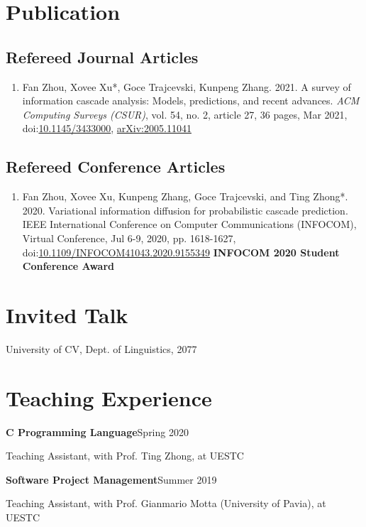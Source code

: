 \documentclass{article}
\newcommand{\cvsection}[1]{\section*{\rmfamily#1}}
\newcommand{\cvsubsection}[1]{\subsection*{\rmfamily\hspace{1.6em}#1}}
\begin{document}
\section*{Publication}

\cvsubsection{Refereed Journal Articles}

\begin{enumerate}[resume]
    \item Fan Zhou, Xovee Xu*, Goce Trajcevski, Kunpeng Zhang. 2021. A survey of information cascade analysis: Models, predictions, and recent advances. \textit{ACM Computing Surveys (CSUR)}, vol. 54, no. 2, article 27, 36 pages, Mar 2021, doi:\href{https://xovee.cn/html/paper-redirects/csur2021.html}{10.1145/3433000}, \href{https://arxiv.org/abs/2005.11041}{arXiv:2005.11041}
\end{enumerate}

\cvsubsection{Refereed Conference Articles}

\begin{enumerate}[resume]
    \item Fan Zhou, Xovee Xu, Kunpeng Zhang, Goce Trajcevski, and Ting Zhong*. 2020. Variational information diffusion for probabilistic cascade prediction. IEEE International Conference on Computer Communications (INFOCOM), Virtual Conference, Jul 6-9, 2020, pp. 1618-1627, doi:\href{https://doi.org/10.1109/INFOCOM41043.2020.9155349}{10.1109/INFOCOM41043.2020.9155349}
    \newline \textbf{\color{red}INFOCOM 2020 Student Conference Award}
\end{enumerate}




\cvsection{Invited Talk}
\indent 

University of CV, Dept. of Linguistics, 2077 



\cvsection{Teaching Experience}
\indent

\textbf{C Programming Language}\hfill Spring 2020

\hspace{2em}Teaching Assistant, with Prof. Ting Zhong, at UESTC

\textbf{Software Project Management}\hfill Summer 2019

\hspace{2em}Teaching Assistant, with Prof. Gianmario Motta (University of Pavia), at UESTC




\end{document}
